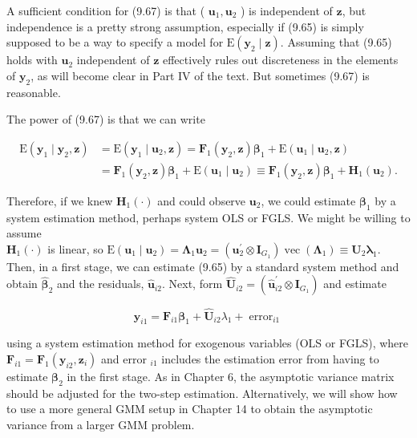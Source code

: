 \documentclass[10pt]{article}
\begin{document}
A sufficient condition for (9.67) is that ( $\mathbf{u}_{1}, \mathbf{u}_{2}$ ) is independent of $\mathbf{z}$, but independence is a pretty strong assumption, especially if (9.65) is simply supposed to be a way to specify a model for $\mathrm{E}\left(\mathbf{y}_{2} \mid \mathbf{z}\right)$. Assuming that (9.65) holds with $\mathbf{u}_{2}$ independent of $\mathbf{z}$ effectively rules out discreteness in the elements of $\mathbf{y}_{2}$, as will become clear in Part IV of the text. But sometimes (9.67) is reasonable.

The power of (9.67) is that we can write


\begin{align*}
\mathrm{E}\left(\mathbf{y}_{1} \mid \mathbf{y}_{2}, \mathbf{z}\right) & =\mathrm{E}\left(\mathbf{y}_{1} \mid \mathbf{u}_{2}, \mathbf{z}\right)=\mathbf{F}_{1}\left(\mathbf{y}_{2}, \mathbf{z}\right) \boldsymbol{\beta}_{1}+\mathrm{E}\left(\mathbf{u}_{1} \mid \mathbf{u}_{2}, \mathbf{z}\right) \\
& =\mathbf{F}_{1}\left(\mathbf{y}_{2}, \mathbf{z}\right) \boldsymbol{\beta}_{1}+\mathrm{E}\left(\mathbf{u}_{1} \mid \mathbf{u}_{2}\right) \equiv \mathbf{F}_{1}\left(\mathbf{y}_{2}, \mathbf{z}\right) \boldsymbol{\beta}_{1}+\mathbf{H}_{1}\left(\mathbf{u}_{2}\right) . \tag{9.68}
\end{align*}


Therefore, if we knew $\mathbf{H}_{1}(\cdot)$ and could observe $\mathbf{u}_{2}$, we could estimate $\boldsymbol{\beta}_{1}$ by a system estimation method, perhaps system OLS or FGLS. We might be willing to assume\\
$\mathbf{H}_{1}(\cdot)$ is linear, so $\mathrm{E}\left(\mathbf{u}_{1} \mid \mathbf{u}_{2}\right)=\boldsymbol{\Lambda}_{1} \mathbf{u}_{2}=\left(\mathbf{u}_{2}^{\prime} \otimes \mathbf{I}_{G_{1}}\right) \operatorname{vec}\left(\boldsymbol{\Lambda}_{1}\right) \equiv \mathbf{U}_{2} \boldsymbol{\lambda}_{1}$. Then, in a first stage, we can estimate (9.65) by a standard system method and obtain $\hat{\boldsymbol{\beta}}_{2}$ and the residuals, $\hat{\mathbf{u}}_{i 2}$. Next, form $\hat{\mathbf{U}}_{i 2}=\left(\hat{\mathbf{u}}_{i 2}^{\prime} \otimes \mathbf{I}_{G_{1}}\right)$ and estimate


\begin{equation*}
\mathbf{y}_{i 1}=\mathbf{F}_{i 1} \boldsymbol{\beta}_{1}+\hat{\mathbf{U}}_{i 2} \lambda_{1}+\operatorname{error}_{i 1} \tag{9.69}
\end{equation*}


using a system estimation method for exogenous variables (OLS or FGLS), where $\mathbf{F}_{i 1}=\mathbf{F}_{1}\left(\mathbf{y}_{i 2}, \mathbf{z}_{i}\right)$ and error $_{i 1}$ includes the estimation error from having to estimate $\boldsymbol{\beta}_{2}$ in the first stage. As in Chapter 6, the asymptotic variance matrix should be adjusted for the two-step estimation. Alternatively, we will show how to use a more general GMM setup in Chapter 14 to obtain the asymptotic variance from a larger GMM problem.
\end{document}
